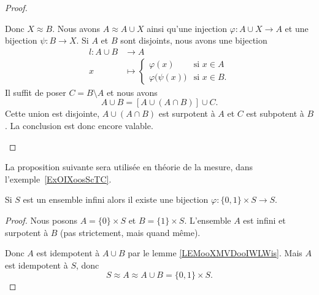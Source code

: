 \begin{proof}
\begin{subproof}
		Donc \( X\approx B\).
		Nous avons \( A\approx A\cup X\) ainsi qu'une injection \( \varphi\colon A\cup X\to A\) et une bijection \( \psi\colon B\to X\).
		Si \( A\) et \( B\) sont disjoints, nous avons une bijection
		\begin{equation}
			\begin{aligned}
				l\colon A\cup B & \to A                                                                   \\
				x               & \mapsto \begin{cases}
					                          \varphi(x)                 & \text{si }  x\in A \\
					                          \varphi\big( \psi(x) \big) & \text{si } x\in B.
				                          \end{cases}
			\end{aligned}
		\end{equation}
		Il suffit de poser \( C=B\setminus A\) et nous avons
		\begin{equation}
			A\cup B=[A\cup (A\cap B)]\cup C.
		\end{equation}
		Cette union est disjointe, \( A\cup(A\cap B)\) est surpotent à \( A\) et \( C\) est subpotent à \( B\). La conclusion est donc encore valable.
	\end{subproof}
\end{proof}

La proposition suivante sera utilisée en théorie de la mesure, dans l'exemple~\ref{ExOIXoosScTC}.
\begin{proposition} \label{PropVCSooMzmIX}
	Si \( S\) est un ensemble infini alors il existe une bijection \( \varphi\colon \{ 0,1 \}\times S\to S\).
\end{proposition}

\begin{proof}
	Nous posons \( A=\{ 0 \}\times S\) et \( B=\{ 1 \}\times S\). L'ensemble \( A\) est infini et surpotent à \( B\) (pas strictement, mais quand même).

	Donc \( A\) est idempotent à \( A\cup B\) par le lemme \ref{LEMooXMVDooIWLWis}. Mais \( A\) est idempotent à \( S\), donc
	\begin{equation}
		S\approx A \approx A\cup B=\{ 0,1 \}\times S.
	\end{equation}
\end{proof}

